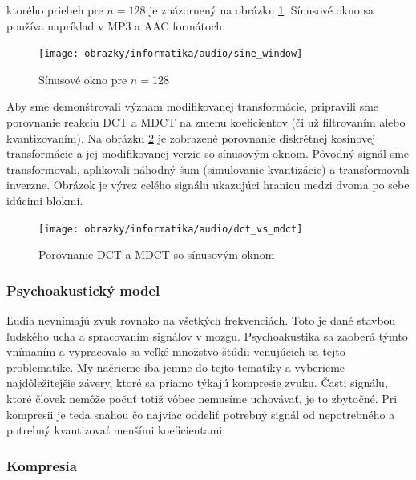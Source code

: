 ktorého priebeh pre $n=128$ je znázornený na obrázku
\ref{fig:sine_window}. Sínusové okno sa používa napríklad v MP3 a AAC
formátoch.

\begin{figure}[htp]
    \centering
    \texttt{[image: obrazky/informatika/audio/sine\_window]}
    \caption{Sínusové okno pre $n=128$}
    \label{fig:sine_window}
\end{figure}

Aby sme demonštrovali význam modifikovanej transformácie, pripravili
sme porovnanie reakciu DCT a MDCT na zmenu koeficientov (či už
filtrovaním alebo kvantizovaním).
Na obrázku \ref{fig:dct_vs_mdct} je zobrazené porovnanie diskrétnej
kosínovej transformácie a jej modifikovanej verzie so sínusovým oknom.
Pôvodný signál sme transformovali, aplikovali náhodný šum (simulovanie
kvantizácie) a transformovali inverzne. Obrázok je výrez celého
signálu ukazujúci hranicu medzi dvoma po sebe idúcimi blokmi.
\begin{figure}[htp]
    \centering
    \texttt{[image: obrazky/informatika/audio/dct\_vs\_mdct]}
    \caption{Porovnanie DCT a MDCT so sínusovým oknom}
    \label{fig:dct_vs_mdct}
\end{figure}

\subsubsection{Psychoakustický model}
Ľudia nevnímajú zvuk rovnako na všetkých frekvenciách. Toto je dané
stavbou ľudského ucha a spracovaním signálov v mozgu. Psychoakustika
sa zaoberá týmto vnímaním a vypracovalo sa veľké množstvo štúdii
venujúcich sa tejto problematike. My načrieme iba jemne do tejto
tematiky a vyberieme najdôležitejšie závery, ktoré sa priamo týkajú
kompresie zvuku. Časti signálu, ktoré človek nemôže počuť totiž vôbec
nemusíme uchovávať, je to zbytočné. Pri kompresii je teda snahou čo
najviac oddeliť potrebný signál od nepotrebného a potrebný kvantizovať
menšími koeficientami.


\subsubsection{Kompresia}

